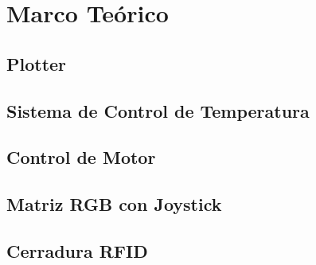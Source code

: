 \section{Marco Teórico}

\subsection{Plotter}

\subsection{Sistema de Control de Temperatura}

\subsection{Control de Motor }

\subsection{Matriz RGB con Joystick}

\subsection{Cerradura RFID}